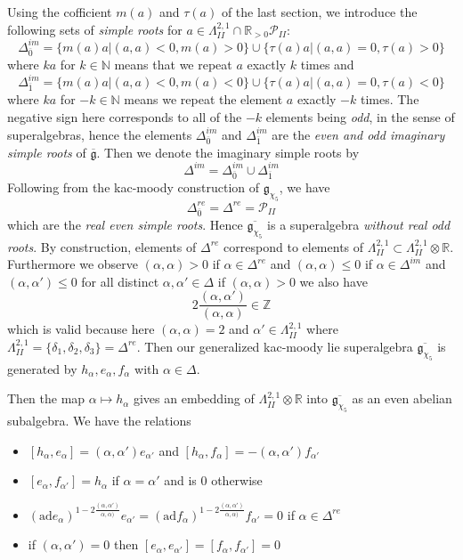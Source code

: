 \documentclass[9pt]{amsart} \usepackage[utf8]{inputenc}
\newcommand{\N}{\mathbb{N}}
\newcommand{\Z}{\mathbb{Z}} \newcommand{\C}{\mathbb{C}}
\newcommand{\R}{\mathbb{R}} \newcommand{\La}{\Lambda}
\newcommand{\Poly}{\mathcal{P}}
\begin{document}
Using the cofficient $m(a)$ and $\tau(a)$ of the last section, we
introduce the following sets of \textit{simple roots} for $a \in
\La^{2,1}_{II} \cap \R_{>0} \Poly_{II}$:
$$\Delta_{\overline{0}}^{im} =\{ m(a)a | (a,a) < 0 , m(a) > 0\} \cup \{\tau(a)a | (a,a) = 0,\tau(a)>0\}$$
where $ka$ for $k\in \N$ means that we repeat $a$ exactly $k$ times and
$$\Delta_{\overline{1}}^{im} = \{ m(a)a | (a,a) < 0 , m(a)< 0\} \cup \{\tau(a)a | (a,a) = 0, \tau(a)<0\}$$
where $ka$ for $-k \in \N$ means we repeat the element $a$ exactly $-k$
times. The negative sign here corresponds to all of the $-k$ elements
being \textit{odd}, in the sense of superalgebras, hence the elements
$\Delta_{\overline{0}}^{im}$ and $\Delta_{\overline{1}}^{im}$ are the
\textit{even and odd imaginary simple roots} of
$\overline{\mathfrak{g}}$.
Then we denote the imaginary simple roots by $$\Delta^{im} =
\Delta_{\overline{0}}^{im} \cup \Delta_{\overline{1}}^{im}$$
Following from the kac-moody construction of $\mathfrak{g}_{\chi_5}$, we
have $$\Delta_{\overline{0}}^{re} = \Delta^{re} = \Poly_{II}$$ which are
the \textit{real even simple roots}. Hence
$\overline{\mathfrak{g}_{\chi_5}}$ is a superalgebra \textit{without real odd
roots}. By construction, elements of $\Delta^{re}$ correspond to
elements of $\La^{2,1}_{II} \subset \La^{2,1}_{II}\otimes \R$.
Furthermore we observe $(\alpha,\alpha) > 0$ if $\alpha \in \Delta^{re}$
and $(\alpha,\alpha) \leq 0$ if $\alpha \in \Delta^{im}$ and
$(\alpha,\alpha') \leq 0$ for all distinct $\alpha, \alpha' \in \Delta$ if
$(\alpha,\alpha) > 0$ we also have
$$2\frac{(\alpha,\alpha')}{(\alpha,\alpha)} \in \Z$$ which is valid
because here $(\alpha,\alpha) = 2$ and $\alpha' \in \La^{2,1}_{II}$
where $\La^{2,1}_{II} = \{\delta_1,\delta_2,\delta_3\} = \Delta^{re}$.
Then our generalized kac-moody lie superalgebra
$\overline{\mathfrak{g}_{\chi_5}}$ is generated by $h_{\alpha},
e_{\alpha}, f_{\alpha}$ with $\alpha \in \Delta$.


Then the map $\alpha \mapsto h_{\alpha}$ gives an embedding of
$\La^{2,1}_{II}\otimes\R$ into $\overline{\mathfrak{g}_{\chi_5}}$ as an
even abelian subalgebra. We have the relations

\begin{itemize}
\item $[h_{\alpha}, e_{\alpha}] = (\alpha, \alpha')e_{\alpha'}$ and
$[h_{\alpha}, f_{\alpha}] = -(\alpha, \alpha')f_{\alpha'}$
\item $[e_{\alpha}, f_{\alpha'}] = h_{\alpha}$ if $\alpha = \alpha'$ and
is $0$ otherwise
\item $(\textrm{ad} e_{\alpha})^{1-
2\frac{(\alpha,\alpha')}{\alpha,\alpha)}}e_{\alpha'} = (\textrm{ad}
f_{\alpha})^{1- 2\frac{(\alpha,\alpha')}{\alpha,\alpha)}}f_{\alpha'} = 0$
if $\alpha \in \Delta^{re}$
\item if $(\alpha,\alpha') = 0$ then $[e_{\alpha}, e_{\alpha'}] =
[f_{\alpha},f_{\alpha'}] = 0$
\end{itemize}
\end{document}
